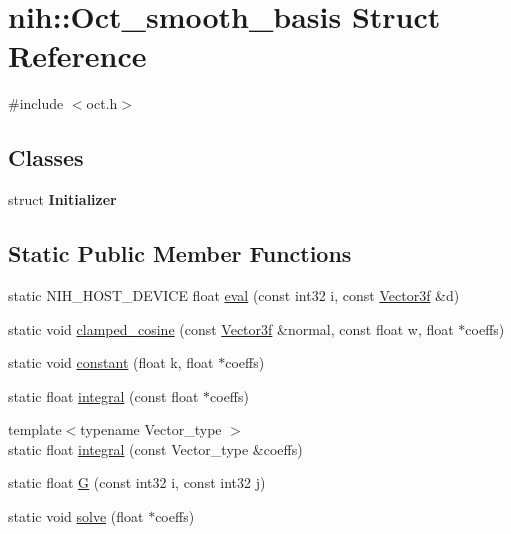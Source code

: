 \hypertarget{structnih_1_1_oct__smooth__basis}{
\section{nih\-:\-:\-Oct\-\_\-smooth\-\_\-basis \-Struct \-Reference}
\label{structnih_1_1_oct__smooth__basis}
}


{\ttfamily \#include $<$oct.\-h$>$}

\subsection*{\-Classes}
\begin{DoxyCompactItemize}
\item 
struct {\bfseries \-Initializer}
\end{DoxyCompactItemize}
\subsection*{\-Static \-Public \-Member \-Functions}
\begin{DoxyCompactItemize}
\item 
static \-N\-I\-H\-\_\-\-H\-O\-S\-T\-\_\-\-D\-E\-V\-I\-C\-E float \hyperlink{structnih_1_1_oct__smooth__basis_aa14a75a18d247804bad176c609a7a0e8}{eval} (const int32 i, const \hyperlink{structnih_1_1_vector}{\-Vector3f} \&d)
\item 
static void \hyperlink{structnih_1_1_oct__smooth__basis_aa0169c6efd1730c823590835cd10418a}{clamped\-\_\-cosine} (const \hyperlink{structnih_1_1_vector}{\-Vector3f} \&normal, const float w, float $\ast$coeffs)
\item 
static void \hyperlink{structnih_1_1_oct__smooth__basis_a8cc76fb6689cc5cddd5923badce7b65a}{constant} (float k, float $\ast$coeffs)
\item 
static float \hyperlink{structnih_1_1_oct__smooth__basis_ac44cf16365644cc8ee5e92347e4b3070}{integral} (const float $\ast$coeffs)
\item 
{\footnotesize template$<$typename Vector\-\_\-type $>$ }\\static float \hyperlink{structnih_1_1_oct__smooth__basis_a76b5bd9b8b77e8f6bdaa3e6eb987b080}{integral} (const \-Vector\-\_\-type \&coeffs)
\item 
static float \hyperlink{structnih_1_1_oct__smooth__basis_a68628b961af6d2c665fe1db6615fb027}{\-G} (const int32 i, const int32 j)
\item 
static void \hyperlink{structnih_1_1_oct__smooth__basis_a4cf03f31e968129821a58231166ae3b6}{solve} (float $\ast$coeffs)
\end{DoxyCompactItemize}
